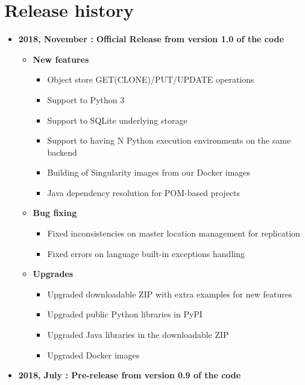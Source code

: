 \chapter*{Release history}

\begin{itemize}
\item[] \textbf{2018, November : Official Release from version 1.0 of the code}\newline
    \begin{itemize}
    \item[] \textbf{New features}
        \begin{itemize}
            \item[] Object store GET(CLONE)/PUT/UPDATE operations
            \item[] Support to Python 3
            \item[] Support to SQLite underlying storage
            \item[] Support to having N Python execution environments on the same backend
            \item[] Building of Singularity images from our Docker images
            \item[] Java dependency resolution for POM-based projects
        \end{itemize}
    \item[] \textbf{Bug fixing}
        \begin{itemize}
            \item[] Fixed inconsistencies on master location management for replication
            \item[] Fixed errors on language built-in exceptions handling
        \end{itemize}
    \item[] \textbf{Upgrades}
        \begin{itemize}
            \item[] Upgraded downloadable ZIP with extra examples for new features
            \item[] Upgraded public Python libraries in PyPI
            \item[] Upgraded Java libraries in the downloadable ZIP
            \item[] Upgraded Docker images\newline
        \end{itemize}
    \end{itemize}
    
\item[] \textbf{2018, July : Pre-release from version 0.9 of the code}

\end{itemize}
